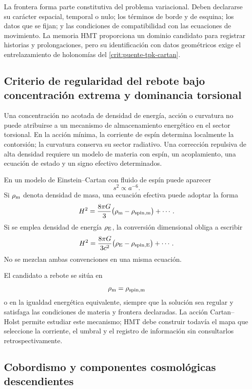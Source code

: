 La frontera forma parte constitutiva del problema variacional. Deben
declararse su carácter espacial, temporal o nulo; los términos de borde y de
esquina; los datos que se fijan; y las condiciones de compatibilidad con las
ecuaciones de movimiento. La memoria HMT proporciona un dominio candidato
para registrar historias y prolongaciones, pero su identificación con datos
geométricos exige el entrelazamiento de holonomías del
\cref{crit:puente-tpk-cartan}.

\subsection{Criterio de regularidad del rebote bajo concentración extrema y dominancia torsional}
\label{sec:rebote-cosmologico-condicionado}

Una concentración no acotada de densidad de energía, acción o curvatura no
puede atribuirse a un mecanismo de almacenamiento energético en el sector
torsional. En la acción mínima, la corriente de espín determina localmente la
contorsión; la curvatura conserva su sector radiativo. Una corrección
repulsiva de alta densidad requiere un modelo de materia con espín, un
acoplamiento, una ecuación de estado y un signo efectivo determinados.

En un modelo de Einstein--Cartan con fluido de espín puede aparecer
\[
 s^2\propto a^{-6}.
\]
Si \(\rho_{\rm m}\) denota densidad de masa, una ecuación efectiva puede
adoptar la forma
\[
 H^2
 =
 \frac{8\pi G}{3}
 \bigl(\rho_{\rm m}-\rho_{\rm spin,m}\bigr)
 +\cdots.
\]
Si se emplea densidad de energía \(\rho_{\rm E}\), la conversión dimensional
obliga a escribir
\[
 H^2
 =
 \frac{8\pi G}{3c^2}
 \bigl(\rho_{\rm E}-\rho_{\rm spin,E}\bigr)
 +\cdots.
\]
No se mezclan ambas convenciones en una misma ecuación.

El candidato a rebote se sitúa en
\[
 \rho_{\rm m}=\rho_{\rm spin,m}
\]
o en la igualdad energética equivalente, siempre que la solución sea regular
y satisfaga las condiciones de materia y frontera declaradas. La acción
Cartan--Holst permite estudiar este mecanismo; HMT debe construir todavía el
mapa que seleccione la corriente, el umbral y el registro de información sin
consultarlos retrospectivamente.

\subsection{Cobordismo y componentes cosmológicas descendientes}
\label{sec:cobordismo-universo-hijo}

